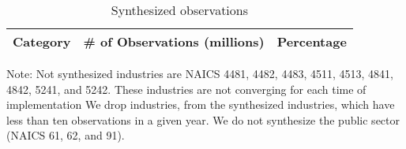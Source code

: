 
\begin{table}[H]
  \centering
\begin{threeparttable}
  \caption{Synthesized observations}  \label{tab:Synthesized_observations} \medskip
  \renewcommand{\arraystretch}{1}
  \begin{tabular}{l  c c }
    \toprule
    \textbf{Category}&\textbf{\# of Observations (millions)}&\textbf{Percentage}\\
    \midrule

   \bottomrule
  \end{tabular} 
\begin{tablenotes}
\small
\item Note: Not synthesized industries are NAICS 4481,    4482,     4483,     4511,     4513,     4841,     4842, 5241, and 5242. These industries are not converging for each time of implementation We drop industries, from the synthesized industries, which have less than ten observations in a given year. We do not synthesize the public sector (NAICS 61, 62, and 91).
 \end{tablenotes}
 \end{threeparttable}
\end{table}
